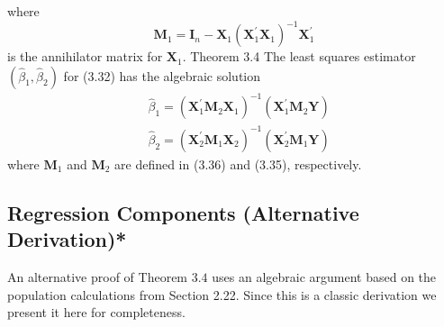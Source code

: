 \documentclass[10pt]{article}
\begin{document}
where
$$
\boldsymbol{M}_{1}=\boldsymbol{I}_{n}-\boldsymbol{X}_{1}\left(\boldsymbol{X}_{1}^{\prime} \boldsymbol{X}_{1}\right)^{-1} \boldsymbol{X}_{1}^{\prime}
$$
is the annihilator matrix for $\boldsymbol{X}_{1}$. Theorem 3.4 The least squares estimator $\left(\widehat{\beta}_{1}, \widehat{\beta}_{2}\right)$ for (3.32) has the algebraic solution
$$
\begin{aligned}
&\widehat{\beta}_{1}=\left(\boldsymbol{X}_{1}^{\prime} \boldsymbol{M}_{2} \boldsymbol{X}_{1}\right)^{-1}\left(\boldsymbol{X}_{1}^{\prime} \boldsymbol{M}_{2} \boldsymbol{Y}\right) \\
&\widehat{\beta}_{2}=\left(\boldsymbol{X}_{2}^{\prime} \boldsymbol{M}_{1} \boldsymbol{X}_{2}\right)^{-1}\left(\boldsymbol{X}_{2}^{\prime} \boldsymbol{M}_{1} \boldsymbol{Y}\right)
\end{aligned}
$$
where $\boldsymbol{M}_{1}$ and $\boldsymbol{M}_{2}$ are defined in (3.36) and (3.35), respectively.

\subsection{Regression Components (Alternative Derivation)*}
An alternative proof of Theorem $3.4$ uses an algebraic argument based on the population calculations from Section 2.22. Since this is a classic derivation we present it here for completeness.
\end{document}
